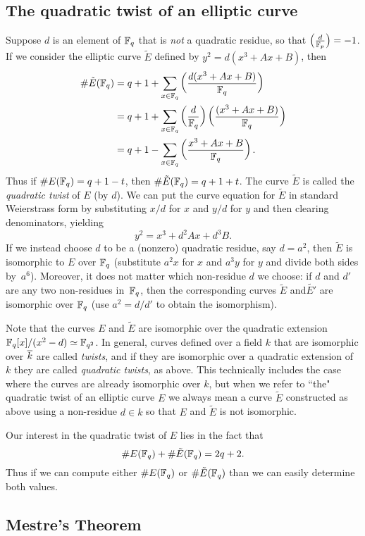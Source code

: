 \subsection{The quadratic twist of an elliptic curve}
Suppose $d$ is an element of $\mathbb{F}_q$ that is \emph{not} a quadratic residue, so that $\left( {\frac{d}{\mathbb{F}_p}} \right)=-1$.
If we consider the elliptic curve $\tilde{E}$ defined by $y^2=d(x^3+Ax+B)$, then
\begin{align*}
\#\tilde{E}(\mathbb{F}_q) &= q+1+\sum_{x\in\mathbb{F}_q}\left(\frac{d(x^3+Ax+B)}{\mathbb{F}_q}\right)\\
&= q+ 1 + \sum_{x\in\mathbb{F}_q}\left(\frac{d}{\mathbb{F}_q}\right)\left(\frac{(x^3+Ax+B)}{\mathbb{F}_q}\right) \\
&= q+1 - \sum_{x\in\mathbb{F}_q}\left(\frac{x^3+Ax+B}{\mathbb{F}_q}\right).
\end{align*}
Thus if $\#E(\mathbb{F}_q)=q+1-t$, then $\#\tilde{E}(\mathbb{F}_q)=q+1+t$.
The curve $\tilde{E}$ is called the \emph{quadratic twist} of $E$ (by $d$).
We can put the curve equation for $\tilde{E}$ in standard Weierstrass form by substituting $x/d$ for $x$ and $y/d$ for $y$ and then clearing denominators,  yielding
\[
y^2=x^3+d^2Ax+d^3B.
\]
If we instead choose $d$ to be a (nonzero) quadratic residue, say $d=a^2$, then $\tilde{E}$ is isomorphic to $E$ over $\mathbb{F}_q$ (substitute $a^2x$ for $x$ and $a^3y$ for $y$ and divide both sides by~$a^6$).
Moreover, it does not matter which non-residue $d$ we choose:
if $d$ and $d'$ are any two non-residues in~$\mathbb{F}_q$, then the corresponding curves $\tilde{E}$ and$\tilde{E'}$ are isomorphic over $\mathbb{F}_q$ (use $a^2=d/d'$ to obtain the isomorphism).

Note that the curves $E$ and $\tilde{E}$  are isomorphic over the quadratic extension $\mathbb{F}_q[x]/(x^2-d)\simeq \mathbb{F}_{q^2}$.
In general, curves defined over a field $k$ that are isomorphic over $\overline{k}$ are called \emph{twists}, and if they are isomorphic over a quadratic extension of $k$ they are called \emph{quadratic twists}, as above.
This technically includes the case where the curves are already isomorphic over $k$, but when we refer to ``the" quadratic twist of an elliptic curve $E$ we always mean a curve $\tilde{E}$ constructed as above using a non-residue $d\in k$ so that $E$ and $\tilde{E}$ is not isomorphic.

Our interest in the quadratic twist of $E$ lies in the fact that
\[
\#E(\mathbb{F}_q) + \#\tilde{E}(\mathbb{F}_q) = 2q+2.
\]
Thus if we can compute either $\#E(\mathbb{F}_q)$ or $\#\tilde{E}(\mathbb{F}_q)$ than we can easily determine both values.


\subsection{Mestre's Theorem}

